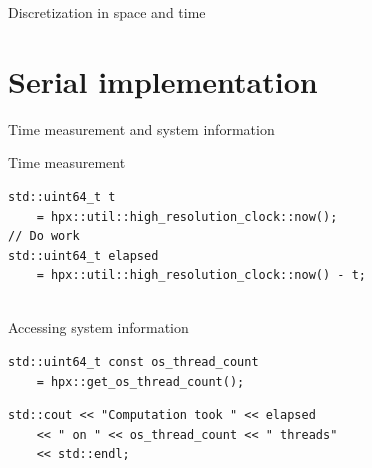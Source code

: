 \documentclass[\classoption]{beamer}
\begin{document}
\begin{frame}{Discretization in space and time}

\begin{center}
\end{center}

\end{frame}

\section{Serial implementation}

\begin{frame}[fragile]{Time measurement and system information}

\begin{block}{Time measurement}
\begin{lstlisting}
std::uint64_t t 
	= hpx::util::high_resolution_clock::now();
// Do work 
std::uint64_t elapsed 
	= hpx::util::high_resolution_clock::now() - t;


\end{lstlisting}
\end{block}

\begin{block}{Accessing system information}
\begin{lstlisting}
std::uint64_t const os_thread_count 
	= hpx::get_os_thread_count();
\end{lstlisting}
\end{block}

\begin{lstlisting}
std::cout << "Computation took " << elapsed 
	<< " on " << os_thread_count << " threads" 
	<< std::endl;
\end{lstlisting}

\end{frame}
\end{document}
